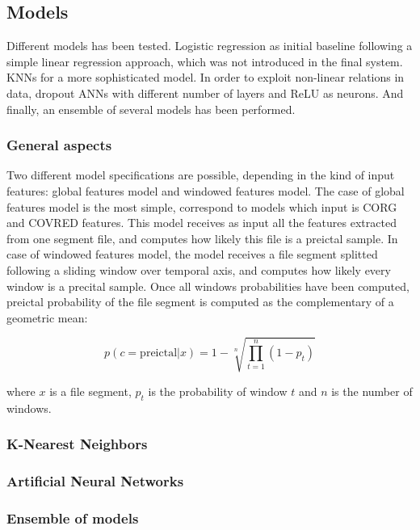 \documentclass[a4paper,english,twoside]{article}
\begin{document}
\subsection{Models}\label{models}

Different models has been tested. Logistic regression as initial
baseline following a simple linear regression approach, which was not
introduced in the final system. KNNs for a more sophisticated model. In
order to exploit non-linear relations in data, dropout ANNs with
different number of layers and ReLU as neurons. And finally, an ensemble
of several models has been performed.

\subsubsection{General aspects}

Two different model specifications are possible, depending in the kind of input
features: global features model and windowed features model. The case of global
features model is the most simple, correspond to models which input is CORG and
COVRED features. This model receives as input all the features extracted from
one segment file, and computes how likely this file is a preictal sample. In
case of windowed features model, the model receives a file segment splitted
following a sliding window over temporal axis, and computes how likely every
window is a precital sample. Once all windows probabilities have been computed,
preictal probability of the file segment is computed as the complementary of a
geometric mean:

\begin{equation}
p(c=\text{preictal} | x) = 1 - \sqrt[n]{\prod_{t=1}^n (1 - p_t)}
\end{equation}

\noindent where $x$ is a file segment, $p_t$ is the probability of window $t$
and $n$ is the number of windows.

\subsubsection{K-Nearest Neighbors}\label{k-nearest-neighbors}

\subsubsection{Artificial Neural
  Networks}\label{artificial-neural-networks}

\subsubsection{Ensemble of models}\label{ensemble-of-models}
\end{document}
